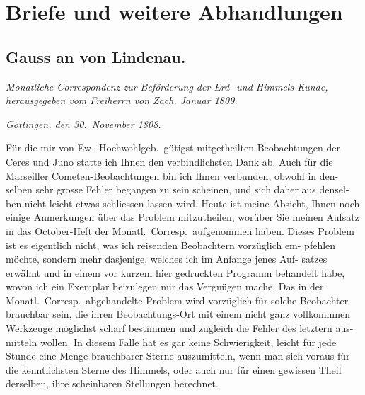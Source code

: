 \documentclass[12pt,a4paper]{article}
\begin{document}
\newpage
\section{Briefe und weitere Abhandlungen}
\label{sec:briefe}


\subsection{Gauss an von Lindenau.}

\begin{center}
\textit{Monatliche Correspondenz zur Beförderung der Erd- und Himmels-Kunde,}\\
\textit{herausgegeben vom Freiherrn von Zach. Januar 1809.}
\end{center}

\vspace{1em}

\noindent
\textit{Göttingen, den 30.\ November 1808.}

\vspace{0.5em}

Für die mir von Ew.\ Hochwohlgeb.\ gütigst mitgetheilten Beobachtungen
der Ceres und Juno statte ich Ihnen den verbindlichsten Dank ab. Auch für
die Marseiller Cometen-Beobachtungen bin ich Ihnen verbunden, obwohl in den-
selben sehr grosse Fehler begangen zu sein scheinen, und sich daher aus densel-
ben nicht leicht etwas schliessen lassen wird. Heute ist meine Absicht, Ihnen
noch einige Anmerkungen über das Problem mitzutheilen, worüber Sie meinen
Aufsatz in das October-Heft der Monatl.\ Corresp.\ aufgenommen haben. Dieses
Problem ist es eigentlich nicht, was ich reisenden Beobachtern vorzüglich em-
pfehlen möchte, sondern mehr dasjenige, welches ich im Anfange jenes Auf-
satzes erwähnt und in einem vor kurzem hier gedruckten Programm behandelt
habe, wovon ich ein Exemplar beizulegen mir das Vergnügen mache. Das in
der Monatl.\ Corresp.\ abgehandelte Problem wird vorzüglich für solche Beobachter
brauchbar sein, die ihren Beobachtungs-Ort mit einem nicht ganz vollkommnen
Werkzeuge möglichst scharf bestimmen und zugleich die Fehler des letztern aus-
mitteln wollen. In diesem Falle hat es gar keine Schwierigkeit, leicht für jede
Stunde eine Menge brauchbarer Sterne auszumitteln, wenn man sich voraus für
die kenntlichsten Sterne des Himmels, oder auch nur für einen gewissen Theil
derselben, ihre scheinbaren Stellungen berechnet.
\end{document}
